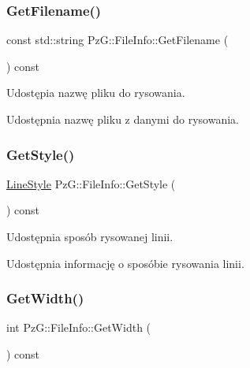 \subsubsection{\texorpdfstring{Get\+Filename()}{GetFilename()}}
{\footnotesize\ttfamily const std\+::string Pz\+G\+::\+File\+Info\+::\+Get\+Filename (\begin{DoxyParamCaption}{ }\end{DoxyParamCaption}) const\hspace{0.3cm}{\ttfamily [inline]}}



Udostępia nazwę pliku do rysowania. 

Udostępnia nazwę pliku z danymi do rysowania. \mbox{\label{class_pz_g_1_1_file_info_aa8a3328daf9365064a98a0dc67f128b8}} 
\subsubsection{\texorpdfstring{Get\+Style()}{GetStyle()}}
{\footnotesize\ttfamily \hyperlink{namespace_pz_g_ab0580cdb6bfe9e51d7de2588bc824076}{Line\+Style} Pz\+G\+::\+File\+Info\+::\+Get\+Style (\begin{DoxyParamCaption}{ }\end{DoxyParamCaption}) const\hspace{0.3cm}{\ttfamily [inline]}}



Udostępnia sposób rysowanej linii. 

Udostępnia informację o sposóbie rysowania linii. \mbox{\label{class_pz_g_1_1_file_info_a336ec97881b709c3bf01d2f27c124e78}} 
\subsubsection{\texorpdfstring{Get\+Width()}{GetWidth()}}
{\footnotesize\ttfamily int Pz\+G\+::\+File\+Info\+::\+Get\+Width (\begin{DoxyParamCaption}{ }\end{DoxyParamCaption}) const\hspace{0.3cm}{\ttfamily [inline]}}



